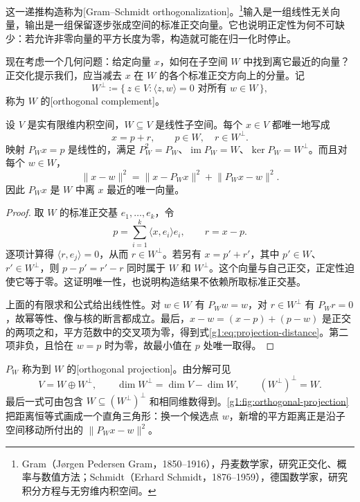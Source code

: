 这一递推构造称为[Gram--Schmidt orthogonalization]。\footnote{Gram（Jørgen Pedersen Gram，1850--1916），丹麦数学家，研究正交化、概率与数值方法；Schmidt（Erhard Schmidt，1876--1959），德国数学家，研究积分方程与无穷维内积空间。}输入是一组线性无关向量，输出是一组保留逐步张成空间的标准正交向量。它也说明正定性为何不可缺少：若允许非零向量的平方长度为零，构造就可能在归一化时停止。

\ProseParagraphBreak

现在考虑一个几何问题：给定向量 \(x\)，如何在子空间 \(W\) 中找到离它最近的向量？正交化提示我们，应当减去 \(x\) 在 \(W\) 的各个标准正交方向上的分量。记
\[
	W^\perp\coloneqq\{\,z\in V:\langle z,w\rangle=0\text{ 对所有 }w\in W\,\},
\]
称为 \(W\) 的[orthogonal complement]。

\begin{proposition}
	\label{g1:prop:projection}
	设 \(V\) 是实有限维内积空间，\(W\subseteq V\) 是线性子空间。每个 \(x\in V\) 都唯一地写成
	\[
		x=p+r,\qquad p\in W,\quad r\in W^\perp.
	\]
	映射 \(P_Wx=p\) 是线性的，满足 \(P_W^2=P_W\)、\(\operatorname{im}P_W=W\)、\(\ker P_W=W^\perp\)。而且对每个 \(w\in W\)，
	\begin{equation}
		\label{g1:eq:projection-distance}
		\lVert x-w\rVert^2
		=\lVert x-P_Wx\rVert^2+\lVert P_Wx-w\rVert^2.
	\end{equation}
	因此 \(P_Wx\) 是 \(W\) 中离 \(x\) 最近的唯一向量。
\end{proposition}

\begin{proof}
	取 \(W\) 的标准正交基 \(e_1,\ldots,e_k\)，令
	\[
		p=\sum_{i=1}^k\langle x,e_i\rangle e_i,\qquad r=x-p.
	\]
	逐项计算得 \(\langle r,e_j\rangle=0\)，从而 \(r\in W^\perp\)。若另有 \(x=p'+r'\)，其中 \(p'\in W\)、\(r'\in W^\perp\)，则 \(p-p'=r'-r\) 同时属于 \(W\) 和 \(W^\perp\)。这个向量与自己正交，正定性迫使它等于零。这证明唯一性，也说明构造结果不依赖所取标准正交基。

	上面的有限求和公式给出线性性。对 \(w\in W\) 有 \(P_Ww=w\)，对 \(r\in W^\perp\) 有 \(P_Wr=0\)，故幂等性、像与核的断言都成立。最后，\(x-w=(x-p)+(p-w)\) 是正交的两项之和，平方范数中的交叉项为零，得到式\eqref{g1:eq:projection-distance}。第二项非负，且恰在 \(w=p\) 时为零，故最小值在 \(p\) 处唯一取得。
\end{proof}

\(P_W\) 称为到 \(W\) 的[orthogonal projection]。由分解可见
\[
	V=W\oplus W^\perp,\qquad \dim W^\perp=\dim V-\dim W,
	\qquad (W^\perp)^\perp=W.
\]
最后一式可由包含 \(W\subseteq(W^\perp)^\perp\) 和相同维数得到。\cref{g1:fig:orthogonal-projection}把距离恒等式画成一个直角三角形：换一个候选点 \(w\)，新增的平方距离正是沿子空间移动所付出的 \(\lVert P_Wx-w\rVert^2\)。

